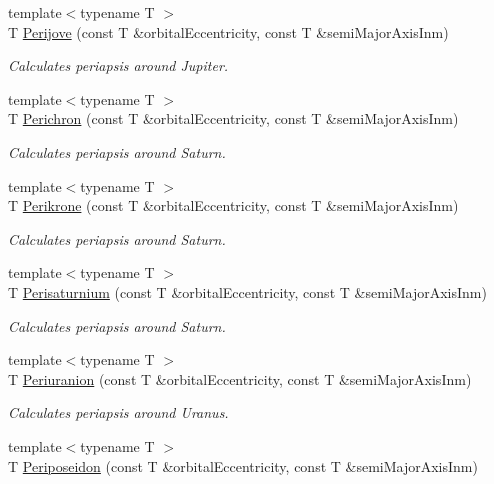 \begin{DoxyCompactItemize}
{\footnotesize template$<$typename T $>$ }\\T \mbox{\hyperlink{group___e_g_x_phys-_periapsis_gae1daec11bd7b479853ba92ca6368a23c}{Perijove}} (const T \&orbital\+Eccentricity, const T \&semi\+Major\+Axis\+Inm)
\begin{DoxyCompactList}\small\item\em Calculates periapsis around Jupiter. \end{DoxyCompactList}\item 
{\footnotesize template$<$typename T $>$ }\\T \mbox{\hyperlink{group___e_g_x_phys-_periapsis_gae8dfb0b7ebcd117ba94f2d1a7b2e13ad}{Perichron}} (const T \&orbital\+Eccentricity, const T \&semi\+Major\+Axis\+Inm)
\begin{DoxyCompactList}\small\item\em Calculates periapsis around Saturn. \end{DoxyCompactList}\item 
{\footnotesize template$<$typename T $>$ }\\T \mbox{\hyperlink{group___e_g_x_phys-_periapsis_ga6b7ae332e74a35cd2c116b4a58204f4b}{Perikrone}} (const T \&orbital\+Eccentricity, const T \&semi\+Major\+Axis\+Inm)
\begin{DoxyCompactList}\small\item\em Calculates periapsis around Saturn. \end{DoxyCompactList}\item 
{\footnotesize template$<$typename T $>$ }\\T \mbox{\hyperlink{group___e_g_x_phys-_periapsis_ga9e41853412b564c33a192f7335e4f6fe}{Perisaturnium}} (const T \&orbital\+Eccentricity, const T \&semi\+Major\+Axis\+Inm)
\begin{DoxyCompactList}\small\item\em Calculates periapsis around Saturn. \end{DoxyCompactList}\item 
{\footnotesize template$<$typename T $>$ }\\T \mbox{\hyperlink{group___e_g_x_phys-_periapsis_ga655892453dddf80d0e60c66c1b8279fd}{Periuranion}} (const T \&orbital\+Eccentricity, const T \&semi\+Major\+Axis\+Inm)
\begin{DoxyCompactList}\small\item\em Calculates periapsis around Uranus. \end{DoxyCompactList}\item 
{\footnotesize template$<$typename T $>$ }\\T \mbox{\hyperlink{group___e_g_x_phys-_periapsis_ga6f36f302670235e04ff91169dde59dbf}{Periposeidon}} (const T \&orbital\+Eccentricity, const T \&semi\+Major\+Axis\+Inm)

\end{DoxyCompactItemize}

